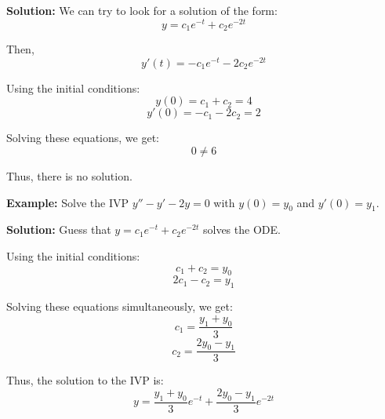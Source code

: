 \documentclass{article}
\begin{document}
\textbf{Solution:} We can try to look for a solution of the form:
\[
y = c_1 e^{-t} + c_2 e^{-2t}
\]

Then,
\[
y'(t) = -c_1 e^{-t} - 2c_2 e^{-2t}
\]

Using the initial conditions:
\[
y(0) = c_1 + c_2 = 4
\]
\[
y'(0) = -c_1 - 2c_2 = 2
\]

Solving these equations, we get:
\[
0 \neq 6
\]

Thus, there is no solution.

\textbf{Example:} Solve the IVP \( y'' - y' - 2y = 0 \) with \( y(0) = y_0 \) and \( y'(0) = y_1 \).

\textbf{Solution:} Guess that \( y = c_1 e^{-t} + c_2 e^{-2t} \) solves the ODE.

Using the initial conditions:
\[
 c_1 + c_2 = y_0
\]
\[
2c_1 - c_2 = y_1
\]

Solving these equations simultaneously, we get:
\[
c_1 = \frac{y_1 + y_0}{3}
\]
\[
c_2 = \frac{2y_0 - y_1}{3}
\]

Thus, the solution to the IVP is:
\[
y = \frac{y_1 + y_0}{3} e^{-t} + \frac{2y_0 - y_1}{3} e^{-2t}
\]
\end{document}
